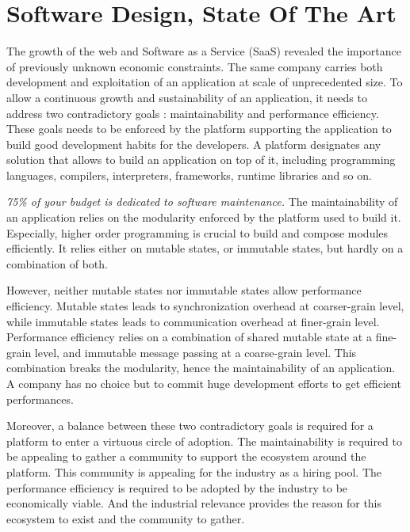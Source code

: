\chapter{Software Design, State Of The Art} \label{chapter3}
\minitoc
\eject


The growth of the web and Software as a Service (SaaS) revealed the importance of previously unknown economic constraints.
The same company carries both development and exploitation of an application at scale of unprecedented size.
To allow a continuous growth and sustainability of an application, it needs to address two contradictory goals : maintainability and performance efficiency.
These goals needs to be enforced by the platform supporting the application to build good development habits for the developers.
A platform designates any solution that allows to build an application on top of it, including programming languages, compilers, interpreters, frameworks, runtime libraries and so on.

\textit{75\% of your budget is dedicated to software maintenance.}
The maintainability of an application relies on the modularity enforced by the platform used to build it.
Especially, higher order programming is crucial to build and compose modules efficiently.
It relies either on mutable states, or immutable states, but hardly on a combination of both.

However, neither mutable states nor immutable states allow performance efficiency.
Mutable states leads to synchronization overhead at coarser-grain level, while immutable states leads to communication overhead at finer-grain level.
Performance efficiency relies on a combination of shared mutable state at a fine-grain level, and immutable message passing at a coarse-grain level.
This combination breaks the modularity, hence the maintainability of an application.
A company has no choice but to commit huge development efforts to get efficient performances.

Moreover, a balance between these two contradictory goals is required for a platform to enter a virtuous circle of adoption.
The maintainability is required to be appealing to gather a community to support the ecosystem around the platform.
This community is appealing for the industry as a hiring pool.
The performance efficiency is required to be adopted by the industry to be economically viable.
And the industrial relevance provides the reason for this ecosystem to exist and the community to gather.

